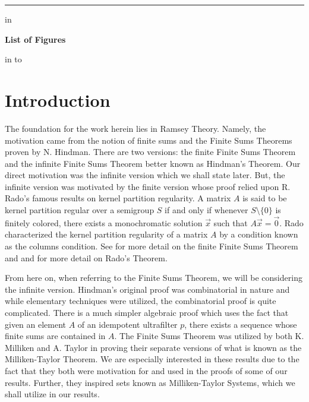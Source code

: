 \documentclass[12pt]{report}
\theoremstyle{definition}
\begin{document}
\newpage


\hrule height 0 pt depth 0 pt
 in
\begin{center}
{\bf \Large List of Figures}
\end{center}
 in
\hbox to 

\newpage
{}

\chapter{Introduction}

\indent

The foundation for the work herein lies in Ramsey
Theory.  Namely, the motivation came from the notion of
finite sums and the Finite Sums Theorems proven by N. Hindman.
There are two versions: the finite Finite Sums Theorem and 
the infinite Finite Sums Theorem better known as Hindman's
Theorem.  Our direct motivation was the infinite version 
which we shall state later.  But, the infinite version was 
motivated by the finite version \cite[Corollary 2.4]{H} 
whose proof relied upon R. Rado's famous results on kernel 
partition regularity.  A 
matrix $A$ is said to be kernel partition regular over a
semigroup $S$ if and only if whenever $S\setminus \{0\}$ is
finitely colored, there exists a monochromatic solution $\vec x$
such that $A\vec x=\vec 0$.  Rado characterized the kernel 
partition regularity of a matrix $A$ by a condition known 
as the columns condition.  See \cite{H} for more detail on 
the finite Finite Sums Theorem and \cite{R} and \cite{R2}
for more detail on Rado's Theorem.

From here on, when referring to the Finite Sums Theorem, we
will be considering the infinite version.  Hindman's original
proof was combinatorial in nature and while elementary
techniques were utilized, the combinatorial proof is quite 
complicated.  There is a much simpler algebraic proof which 
uses the fact that given an element $A$ of an idempotent 
ultrafilter $p$, there exists a sequence whose finite sums
are contained in $A$.  The 
Finite Sums Theorem was utilized by both K. Milliken and A. 
Taylor in proving their separate versions of what is known
as the Milliken-Taylor Theorem.  We are especially interested 
in these results due to the fact that they both were 
motivation for and used in the proofs of some of our results.  
Further, they inspired sets known as Milliken-Taylor Systems,
which we shall utilize in our results. 
\end{document}
